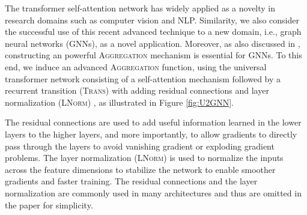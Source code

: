 \documentclass[twoside,leqno,twocolumn]{article}
\newcommand{\citep}{\cite}
\begin{document}
The transformer self-attention network \citep{vaswani2017attention,dehghani2018universal} has widely applied as a novelty in research domains such as computer vision and NLP.
Similarity, we also consider the successful use of this recent advanced technique to a new domain, i.e., graph neural networks (GNNs), as a novel application.
Moreover, as also discussed in \citep{xu2019powerful}, constructing an powerful \textsc{Aggregation} mechanism is essential for GNNs. To this end, we induce an advanced \textsc{Aggregation} function, using the universal transformer network \citep{dehghani2018universal} consisting of a self-attention mechanism \citep{vaswani2017attention} followed by a recurrent transition (\textsc{Trans}) with adding residual connections \citep{he2016deep} and layer normalization (\textsc{LNorm}) \citep{ba2016layer}, as illustrated in Figure \ref{fig:U2GNN}.

The residual connections \citep{he2016deep} are used to add useful information learned in the lower layers to the higher layers, and more importantly, to allow gradients to directly pass through the layers to avoid vanishing gradient or exploding gradient problems.
The layer normalization (\textsc{LNorm}) \citep{ba2016layer} is used to normalize the inputs across the feature dimensions to stabilize the network to enable smoother gradients and faster training. 
The residual connections and the layer normalization are commonly used in many architectures and thus are omitted in the paper for simplicity.
\end{document}
